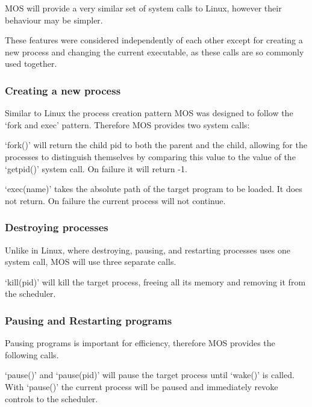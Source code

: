 \documentclass[a4paper]{report}
\begin{document}
MOS will provide a very similar set of system calls to Linux, however their behaviour may be simpler.

These features were considered independently of each other except for creating a new process and changing the current executable, as these calls are so commonly used together.

\subsubsection{Creating a new process}

Similar to Linux the process creation pattern MOS was designed to follow the `fork and exec' pattern. Therefore MOS provides two system calls:

\vspace{1.5mm}
\noindent
`fork()' will return the child pid to both the parent and the child, allowing for the processes to distinguish themselves by comparing this value to the value of the `get\textunderscore pid()' system call. On failure it will return -1.

\vspace{1.5mm}
\noindent
`exec(name)' takes the absolute path of the target program to be loaded. It does not return. On failure the current process will not continue.

\subsubsection{Destroying processes}

Unlike in Linux, where destroying, pausing, and restarting processes uses one system call, MOS will use three separate calls.

\vspace{1.5mm}
\noindent
`kill(pid)' will kill the target process, freeing all its memory and removing it from the scheduler.

\subsubsection{Pausing and Restarting programs}

Pausing programs is important for efficiency, therefore MOS provides the following calls.

\vspace{1.5mm}
\noindent
`pause()' and `pause(pid)' will pause the target process until `wake()' is called. With `pause()' the current process will be paused and immediately revoke controls to the scheduler.
\end{document}

